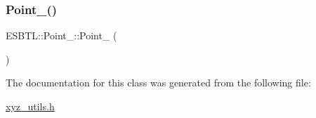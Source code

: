 \mbox{\label{classESBTL_1_1Point__3_acf3a956281639ad03a4b1255e81fec12}} 
\subsubsection{\texorpdfstring{Point\+\_()}{Point\_3()}\hspace{0.1cm}{\footnotesize\ttfamily [2/2]}}
{\footnotesize\ttfamily E\+S\+B\+T\+L\+::\+Point\+\_\+::\+Point\+\_ (\begin{DoxyParamCaption}{ }\end{DoxyParamCaption})\hspace{0.3cm}{\ttfamily [inline]}}



The documentation for this class was generated from the following file\+:\begin{DoxyCompactItemize}
\item 
\hyperlink{xyz__utils_8h}{xyz\+\_\+utils.\+h}\end{DoxyCompactItemize}
